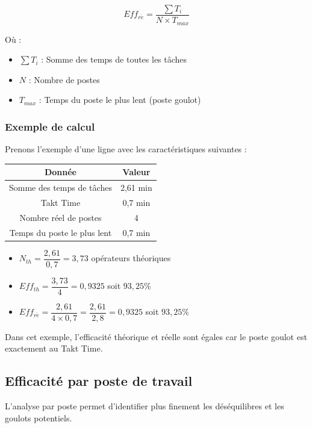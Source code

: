 \documentclass[12pt,a4paper]{article}
\begin{document}
\[
\boxed{Eff_{r\acute{e}} = \frac{\sum T_i}{N \times T_{max}}}
\]

Où :
\begin{itemize}
    \item $\sum T_i$ : Somme des temps de toutes les tâches
    \item $N$ : Nombre de postes
    \item $T_{max}$ : Temps du poste le plus lent (poste goulot)
\end{itemize}

\subsubsection{Exemple de calcul}

Prenons l'exemple d'une ligne avec les caractéristiques suivantes :

\begin{table}[H]
\centering
\begin{tabular}{|c|c|}
\hline
\textbf{Donnée} & \textbf{Valeur} \\
\hline
Somme des temps de tâches & 2,61 min \\
\hline
Takt Time & 0,7 min \\
\hline
Nombre réel de postes & 4 \\
\hline
Temps du poste le plus lent & 0,7 min \\
\hline
\end{tabular}
\end{table}

\begin{itemize}
    \item $N_{th} = \dfrac{2,61}{0,7} = 3,73$ opérateurs théoriques
    \item $Eff_{th} = \dfrac{3,73}{4} = 0,9325$ soit $93,25\%$
    \item $Eff_{r\acute{e}} = \dfrac{2,61}{4 \times 0,7} = \dfrac{2,61}{2,8} = 0,9325$ soit $93,25\%$
\end{itemize}

Dans cet exemple, l'efficacité théorique et réelle sont égales car le poste goulot est exactement au Takt Time.

\subsection{Efficacité par poste de travail}

L'analyse par poste permet d'identifier plus finement les déséquilibres et les goulots potentiels.
\end{document}

